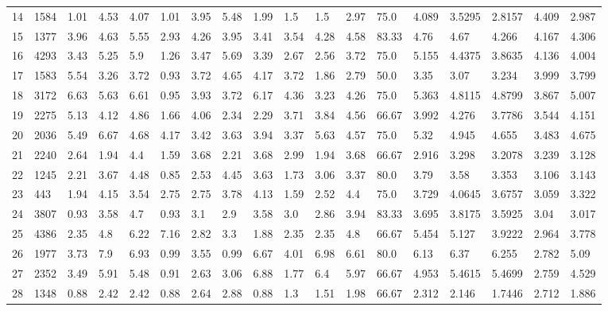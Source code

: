 \documentclass[landscape, 10pt]{report}
\begin{document}
\begin{longtable}{l || l || l | l | l | l | l | l | l | l | l | l | l || l | l | l | l | l}
14 & 1584 & 1.01 & 4.53 & 4.07 & 1.01 & 3.95 & 5.48 & 1.99 & 1.5 & 1.5 & 2.97 & 75.0 & 4.089 & 3.5295 & 2.8157 & 4.409 & 2.987\\ 
\rowcolor{lightgray}15 & 1377 & 3.96 & 4.63 & 5.55 & 2.93 & 4.26 & 3.95 & 3.41 & 3.54 & 4.28 & 4.58 & 83.33 & 4.76 & 4.67 & 4.266 & 4.167 & 4.306\\ 
16 & 4293 & 3.43 & 5.25 & 5.9 & 1.26 & 3.47 & 5.69 & 3.39 & 2.67 & 2.56 & 3.72 & 75.0 & 5.155 & 4.4375 & 3.8635 & 4.136 & 4.004\\ 
\rowcolor{lightgray}17 & 1583 & 5.54 & 3.26 & 3.72 & 0.93 & 3.72 & 4.65 & 4.17 & 3.72 & 1.86 & 2.79 & 50.0 & 3.35 & 3.07 & 3.234 & 3.999 & 3.799\\ 
18 & 3172 & 6.63 & 5.63 & 6.61 & 0.95 & 3.93 & 3.72 & 6.17 & 4.36 & 3.23 & 4.26 & 75.0 & 5.363 & 4.8115 & 4.8799 & 3.867 & 5.007\\ 
\rowcolor{lightgray}19 & 2275 & 5.13 & 4.12 & 4.86 & 1.66 & 4.06 & 2.34 & 2.29 & 3.71 & 3.84 & 4.56 & 66.67 & 3.992 & 4.276 & 3.7786 & 3.544 & 4.151\\ 
20 & 2036 & 5.49 & 6.67 & 4.68 & 4.17 & 3.42 & 3.63 & 3.94 & 3.37 & 5.63 & 4.57 & 75.0 & 5.32 & 4.945 & 4.655 & 3.483 & 4.675\\ 
\rowcolor{lightgray}21 & 2240 & 2.64 & 1.94 & 4.4 & 1.59 & 3.68 & 2.21 & 3.68 & 2.99 & 1.94 & 3.68 & 66.67 & 2.916 & 3.298 & 3.2078 & 3.239 & 3.128\\ 
22 & 1245 & 2.21 & 3.67 & 4.48 & 0.85 & 2.53 & 4.45 & 3.63 & 1.73 & 3.06 & 3.37 & 80.0 & 3.79 & 3.58 & 3.353 & 3.106 & 3.143\\ 
\rowcolor{lightgray}23 & 443 & 1.94 & 4.15 & 3.54 & 2.75 & 2.75 & 3.78 & 4.13 & 1.59 & 2.52 & 4.4 & 75.0 & 3.729 & 4.0645 & 3.6757 & 3.059 & 3.322\\ 
24 & 3807 & 0.93 & 3.58 & 4.7 & 0.93 & 3.1 & 2.9 & 3.58 & 3.0 & 2.86 & 3.94 & 83.33 & 3.695 & 3.8175 & 3.5925 & 3.04 & 3.017\\ 
\rowcolor{lightgray}25 & 4386 & 2.35 & 4.8 & 6.22 & 7.16 & 2.82 & 3.3 & 1.88 & 2.35 & 2.35 & 4.8 & 66.67 & 5.454 & 5.127 & 3.9222 & 2.964 & 3.778\\ 
26 & 1977 & 3.73 & 7.9 & 6.93 & 0.99 & 3.55 & 0.99 & 6.67 & 4.01 & 6.98 & 6.61 & 80.0 & 6.13 & 6.37 & 6.255 & 2.782 & 5.09\\ 
\rowcolor{lightgray}27 & 2352 & 3.49 & 5.91 & 5.48 & 0.91 & 2.63 & 3.06 & 6.88 & 1.77 & 6.4 & 5.97 & 66.67 & 4.953 & 5.4615 & 5.4699 & 2.759 & 4.529\\ 
28 & 1348 & 0.88 & 2.42 & 2.42 & 0.88 & 2.64 & 2.88 & 0.88 & 1.3 & 1.51 & 1.98 & 66.67 & 2.312 & 2.146 & 1.7446 & 2.712 & 1.886\\ 

\end{longtable}
\end{document}

